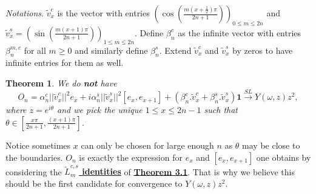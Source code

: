 \documentclass[twoside,11pt,titlepage]{amsart}
\renewcommand{\=}[1]{\stackrel{#1}{=}} %
\newtheorem{thm}{Theorem}[section]
\theoremstyle{definition}
\theoremstyle{remark}
\begin{document}
\textit{Notations}.  $\widetilde{v}_x^c$ is the vector with entries $(\cos(\frac{m(x+\frac{1}{2})\pi}{2n+1}))_{0\le m\le 2n}$ and $\widetilde{v}_x^s=(\sin(\frac{m(x+1)\pi}{2n+1}))_{1\le m\le 2n}$. Define $\beta_n^c$ as the infinite vector with entries $\beta_n^{m,c}$ for all $m\ge 0$ and similarly define $\beta_n^s$. Extend $\widetilde{v}_x^c$ and $\widetilde{v}_x^s$ by zeros to have infinite entries for them as well.
\begin{thm}\label{thm4.15}
We do \textbf{not} have 
$$O_n=\alpha_n^c||\widetilde{v}_x^c||^2e_x+i\alpha_n^s||\widetilde{v}_x^s||^2[e_x,e_{x+1}]+(\beta_n^c.\widetilde{v}_x^c+\beta_n^s.\widetilde{v}_x^s)\textbf{1} \xrightarrow{SL} Y(\omega,z)z^2,$$
where $z=e^{i\theta}$ and we pick the unique $1 \le x\le 2n-1$ such that $\theta \in [\frac{x\pi}{2n+1},\frac{(x+1)\pi}{2n+1}]$.
\end{thm}
Notice sometimes $x$ can only be chosen for large enough $n$ as $\theta$ may be close to the boundaries. $O_n$ is exactly the expression for $e_x$ and $[e_x,e_{x+1}]$ one obtains by considering the \hyperref[identities]{\textbf{$\widetilde{L}_m^{c,s}$ identities}} of \hyperref[thm3.1]{\textbf{Theorem 3.1}}. That is why we believe this should be the first candidate for convergence to $Y(\omega,z)z^2$. 
\end{document}
